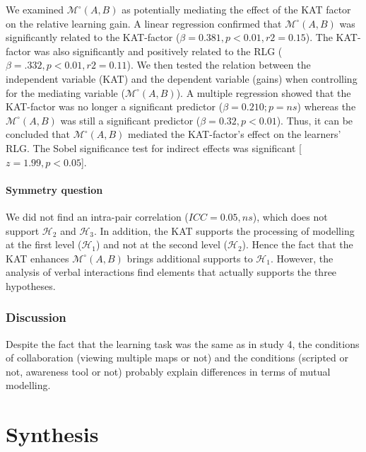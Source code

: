 \documentclass[natbib]{svjour3}
\newcommand{\gmodel}[2]{{$\mathcal{M}(#1, #2)$}}
\newcommand{\gModel}[2]{{$\mathcal{M}^{\circ}(#1, #2)$}}
\begin{document}
We examined \gModel{A}{B} as potentially mediating the effect of the KAT factor
on the relative learning gain. A linear regression confirmed that \gModel{A}{B}
was significantly related to the KAT-factor ($\beta= 0.381, p < 0.01, r2 = 0.15$).
The KAT-factor was also significantly and positively related to the RLG ($\beta=
.332, p < 0.01, r2 = 0.11$). We then tested the relation between the independent
variable (KAT) and the dependent variable (gains) when controlling for the
mediating variable (\gModel{A}{B}). A multiple regression showed that the
KAT-factor was no longer a significant predictor ($\beta= 0.210; p = ns$) whereas
the \gModel{A}{B} was still a significant predictor ($\beta= 0.32, p < 0.01$).
Thus, it can be concluded that \gModel{A}{B} mediated the KAT-factor's effect on
the learners' RLG. The Sobel significance test for indirect effects was
significant [$z = 1.99, p < 0.05$]. 

\paragraph{Symmetry question} We did not find an intra-pair correlation ($ICC =
0.05, ns$), which does not support $\mathcal{H}_{2}$ and $\mathcal{H}_{3}$. In
addition, the KAT supports the processing of modelling at the first level
($\mathcal{H}_{1}$) and not at the second level ($\mathcal{H}_{2}$). Hence the
fact that the KAT enhances  \gModel{A}{B}  brings additional supports to
$\mathcal{H}_{1}$. However, the analysis of verbal interactions find elements
that actually supports the three hypotheses.


\subsubsection*{Discussion}

Despite the fact that the learning task was the same as in study 4, the
conditions of collaboration (viewing multiple maps or not) and the conditions
(scripted or not, awareness tool or not) probably explain differences in terms
of mutual modelling.

\section{Synthesis}
\end{document}
